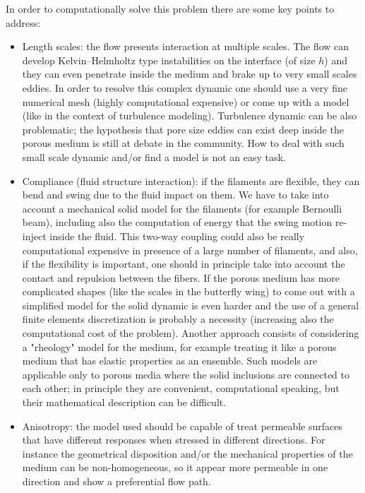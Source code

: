 In order to computationally solve this problem there are some key points to address:
\begin{itemize}
	\item Length scales: the flow presents interaction at multiple scales. The flow can develop Kelvin–Helmholtz type instabilities on the interface (of size $h$) and they can even penetrate inside the medium and brake up to very small scales eddies. In order to resolve this complex dynamic one should use a very fine numerical mesh (highly computational expensive) or come up with a model (like in the context of turbulence modeling).
	Turbulence dynamic can be also problematic; the hypothesis that pore size eddies can exist deep inside the porous medium is still at debate in the community.
	How to deal with such small scale dynamic and/or find a model is not an easy task.
	
	\item Compliance (fluid structure interaction): if the filaments are flexible, they can bend and swing due to the fluid impact on them.
	We have to take into account a mechanical solid model for the filaments (for example Bernoulli beam), including also the computation of energy that the swing motion re-inject inside the fluid.
	This two-way coupling could also be really computational expensive in presence of a large number of filaments, and also, if the flexibility is important, one should in principle take into account the contact and repulsion between the fibers.
	If the porous medium has more complicated shapes (like the scales in the butterfly wing) to come out with a simplified model for the solid dynamic is even harder and the use of a general finite elements discretization is probably a necessity (increasing also the computational cost of the problem).
	Another approach consists of considering a "rheology" model for the medium, for example treating it like a porous medium that has elastic properties as an ensemble.
	Such models are applicable only to porous media where the solid inclusions are connected to each other; in principle they are convenient, computational speaking, but their mathematical description can be difficult.
	
	\item Anisotropy: the model used should be capable of treat permeable surfaces that have different responses when stressed in different directions. For instance the geometrical disposition and/or the mechanical properties of the medium can be non-homogeneous, so it appear more permeable in one direction and show a preferential flow path.
\end{itemize}

